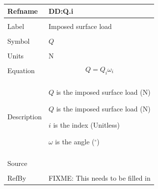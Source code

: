 \documentclass[12pt]{article}
\begin{document}
\noindent \begin{minipage}{\textwidth}
\begin{tabular}{p{} p{}}
\toprule \textbf{Refname} & \textbf{DD:Q.i}
\label{DD:Q.i}
\\ \midrule \\
Label & Imposed surface load
\\ \midrule \\
Symbol & $Q$
\\ \midrule \\
Units & N
\\ \midrule \\
Equation & \begin{dmath}
           Q=Q_{i} ω_{i}
           \end{dmath}
\\ \midrule \\
Description & \begin{symbDescription}
              \item{$Q$ is the imposed surface load (N)}
              \item{$Q$ is the imposed surface load (N)}
              \item{$i$ is the index (Unitless)}
              \item{$ω$ is the angle (${}^{\circ}$)}
              \end{symbDescription}
\\ \midrule \\
Source & 
\\ \midrule \\
RefBy & FIXME: This needs to be filled in
\\ \bottomrule \end{tabular}
\end{minipage}\\
~\newline
\end{document}
